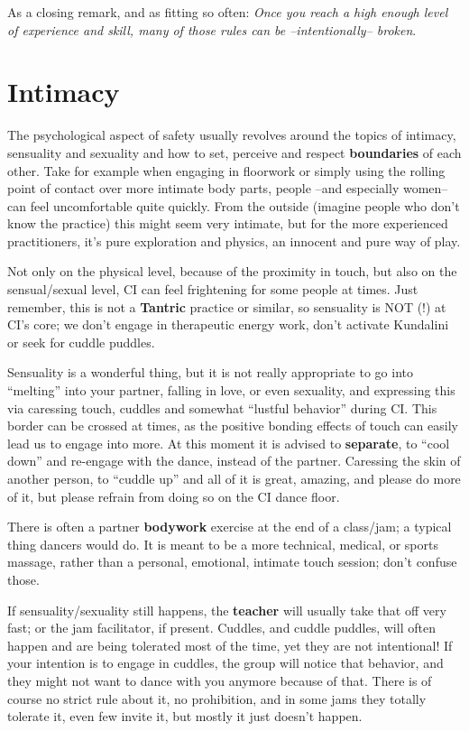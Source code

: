 As a closing remark, and as fitting so often: \textit{Once you reach a high enough level of experience and skill, many of those rules can be --intentionally-- broken}.

\section{Intimacy}\label{sec:intimacy}

The psychological aspect of safety usually revolves around the topics of intimacy, sensuality and sexuality and how to set, perceive and respect \textbf{boundaries} of each other.
Take for example when engaging in floorwork or simply using the rolling point of contact over more intimate body parts, people --and especially women-- can feel uncomfortable quite quickly.
From the outside (imagine people who don't know the practice) this might seem very intimate, but for the more experienced practitioners, it's pure exploration and physics, an innocent and pure way of play.

Not only on the physical level, because of the proximity in touch, but also on the sensual/sexual level, CI can feel frightening for some people at times.
Just remember, this is not a \textbf{Tantric} practice or similar, so sensuality is NOT (!) at CI's core; we don't engage in therapeutic energy work, don't activate Kundalini or seek for cuddle puddles.

Sensuality is a wonderful thing, but it is not really appropriate to go into ``melting'' into your partner, falling in love, or even sexuality, and expressing this via caressing touch, cuddles and somewhat ``lustful behavior'' during CI\@.
This border can be crossed at times, as the positive bonding effects of touch can easily lead us to engage into more.
At this moment it is advised to \textbf{separate}, to ``cool down'' and re-engage with the dance, instead of the partner.
Caressing the skin of another person, to ``cuddle up'' and all of it is great, amazing, and please do more of it, but please refrain from doing so on the CI dance floor.

There is often a partner \textbf{bodywork} exercise at the end of a class/jam; a typical thing dancers would do.
It is meant to be a more technical, medical, or sports massage, rather than a personal, emotional, intimate touch session; don't confuse those.

If sensuality/sexuality still happens, the \textbf{teacher} will usually take that off very fast; or the jam facilitator, if present.
Cuddles, and cuddle puddles, will often happen and are being tolerated most of the time, yet they are not intentional!
If your intention is to engage in cuddles, the group will notice that behavior, and they might not want to dance with you anymore because of that.
There is of course no strict rule about it, no prohibition, and in some jams they totally tolerate it, even few invite it, but mostly it just doesn't happen.


